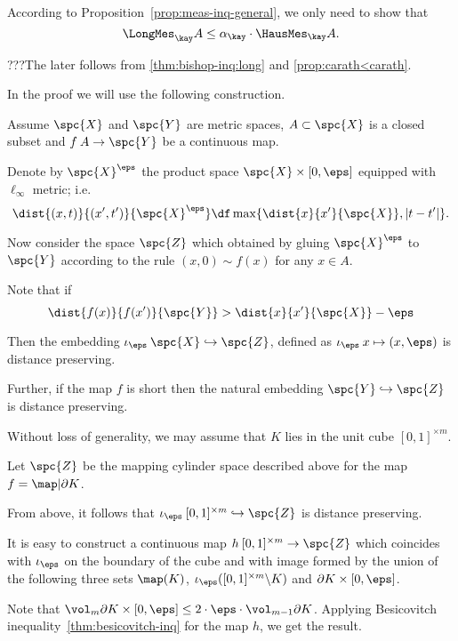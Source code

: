 According to Proposition~\ref{prop:meas-inq-general},
we only need to show that 
\[\LongMes_\kay A
\le
\alpha_\kay\cdot\HausMes_\kay A.\]

???The later follows from 
\ref{thm:bishop-inq:long} 
and \ref{prop:carath<carath}.
\qeds














In the proof we will use the following construction.

Assume $\spc{X}$ and $\spc{Y}$ are metric spaces,
$A\subset \spc{X}$ is a closed subset and 
$f\:A\to \spc{Y}$ be a continuous map.

Denote by $\spc{X}^\eps$
the product space $\spc{X}\times [0,\eps]$ equipped with $\ell_\infty$ metric;
i.e. 
\[\dist{(x,t)}{(x',t')}{\spc{X}^\eps}
\df\max\{\dist{x}{x'}{\spc{X}},|t-t'|\}.
\]

Now consider the space $\spc{Z}$ which obtained by gluing $\spc{X}^\eps$ to $\spc{Y}$ according to the rule $(x,0)\sim f(x)$ for any $x\in A$.

Note that if 
\[
\dist{f(x)}{f(x')}{\spc{Y}}
>
\dist{x}{x'}{\spc{X}}-\eps
\]

Then the embedding 
$\iota_\eps\:\spc{X}\hookrightarrow\spc{Z}$,
defined as $\iota_\eps\:x\mapsto (x,\eps)$
is distance preserving.

Further, if the map $f$ is short then
the natural embedding $\spc{Y}\hookrightarrow\spc{Z}$ is distance preserving.




Without loss of generality, we may assume that 
$K$ 
lies in the unit cube $[0,1]^{\times m}$.

Let $\spc{Z}$ be the mapping cylinder space described above for the map $f=\map|\partial K$.

From above, it follows that $\iota_\eps\:[0,1]^{\times m}\hookrightarrow\spc{Z}$ is distance preserving.

It is easy to construct a continuous map 
$h\:[0,1]^{\times m}\to \spc{Z}$
which coincides with $\iota_\eps$ on the boundary of the cube and with image formed by the union of the following three sets
$\map (K)$,
$\iota_\eps([0,1]^{\times m}\backslash K)$
and $\partial K\times [0,\eps]$.

Note that $\vol_m \partial K\times [0,\eps]\le 2\cdot \eps\cdot \vol_{m-1} \partial K$.
Applying Besicovitch inequality~\ref{thm:besicovitch-inq} for the map $h$, we get the result.\qeds














